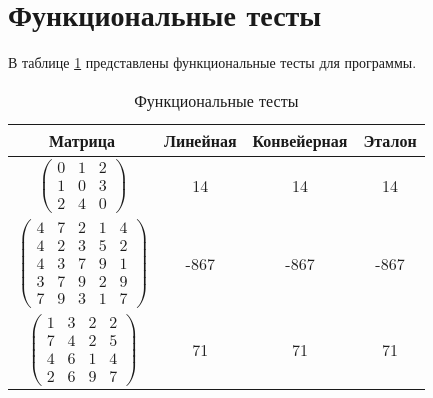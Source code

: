 \section{Функциональные тесты}
\hspace{\parindent}В таблице  \ref{tbl:testing} представлены функциональные тесты для программы.
\begin{table}[h]
	\begin{center}
		\captionsetup{skip=0pt,justification=raggedright,singlelinecheck=off}
		\caption{Функциональные тесты}
		\label{tbl:testing}
		\begin{tabular}{|c|c|c|c|}
			\hline
			Матрица & Линейная & Конвейерная & Эталон\\
			\hline
			 $\begin{pmatrix}
				0 & 1 & 2\\
				1 & 0 & 3\\
				2 & 4 & 0
			\end{pmatrix}$ &
			14 &
			14 &
			14 \\
			\hline
			$\begin{pmatrix}
				4 & 7 & 2 & 1 & 4\\
				4 & 2 & 3 & 5 & 2\\
				4 & 3 & 7 & 9 & 1\\
				3 & 7 & 9 & 2 & 9\\
				7 & 9 & 3 & 1 & 7
			\end{pmatrix}$ &
			-867 & -867 & -867 \\
			\hline
			$\begin{pmatrix}
				1 & 3 & 2 & 2\\
				7 & 4 & 2 & 5\\
				4 & 6 & 1 & 4\\
				2 & 6 & 9 & 7
			\end{pmatrix}$ &
			71 & 71 & 71 \\
			\hline
		\end{tabular}	
	\end{center}
\end{table}